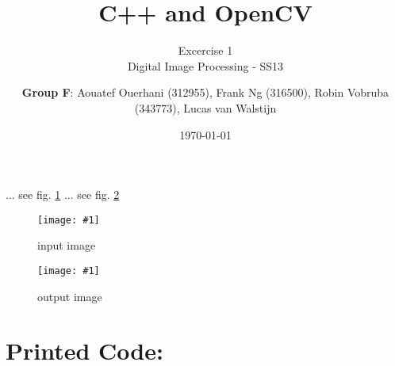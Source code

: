 \documentclass[a4paper,headings=small]{scrartcl}
\title{C++ and OpenCV}
\subtitle{Excercise 1 \\ Digital Image Processing - SS13}
\author{\textbf{Group F}: Aouatef Ouerhani (312955), Frank Ng (316500), Robin Vobruba (343773), Lucas van Walstijn}
\date{\today}
\numberwithin{equation}{section} %
\numberwithin{figure}{section}   %
\newcommand{\image}[3]{
	\begin{figure}[htbp]
		\centering
		\texttt{[image: \#1]}
		\caption{#3}
		\label{fig:#1}
	\end{figure}
}
\newcommand{\imgRoot}{../resources/img}
\newcommand{\imgGeneratedRoot}{../../../target}
\begin{document}
\maketitle

... see fig. \ref{fig:\imgRoot/input.jpg}
... see fig. \ref{fig:\imgGeneratedRoot/output.jpg}


\image{\imgRoot/input.jpg}{0.9}{%
		input image}

\image{\imgGeneratedRoot/output.jpg}{0.9}{%
		output image}


\newpage
\section{Printed Code:}


\end{document}
